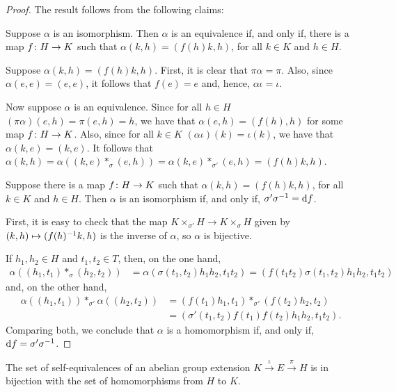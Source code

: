 \begin{proof}
	The result follows from the following claims:
	\newclaims
	\begin{claim}
		Suppose $\alpha$ is an isomorphism.
		Then $\alpha$ is an equivalence if, and only if, there is a map $f\colon H \to K$ such that $\alpha(k,h) = (f(h)k, h)$, for all $k\in K$ and $h\in H$.
	\end{claim}

	Suppose $\alpha(k,h) = (f(h)k, h)$.
	First, it is clear that $\pi \alpha = \pi$.
	Also, since $\alpha(e,e) = (e,e)$, it follows that $f(e) = e$ and, hence, $\alpha \iota = \iota$.

	Now suppose $\alpha$ is an equivalence.
	Since for all $h\in H$ $(\pi \alpha) (e, h) = \pi (e, h) = h$, we have that $\alpha (e, h) = (f(h), h)$ for some map $f\colon H\to K$.
	Also, since for all $k\in K$ $(\alpha \iota) (k) = \iota(k)$, we have that $\alpha(k, e) = (k,e)$.
	It follows that $\alpha (k,h) = \alpha((k,e) *_\sigma (e, h)) = \alpha(k, e) *_{\sigma'} (e, h) = (f(h)k, h)$.

	\begin{claim}
		Suppose there is a map $f\colon H \to K$ such that $\alpha(k,h) = (f(h)k, h)$, for all $k\in K$ and $h\in H$.
		Then $\alpha$ is an isomorphism if, and only if, $\sigma'\sigma^{-1} = \mathrm{d}f$.
	\end{claim}

	First, it is easy to check that the map $K \times_{\sigma'} H \to K \times_{\sigma} H$ given by $(k,h)\mapsto (f(h)^{-1} k, h)$ is the inverse of $\alpha$, so $\alpha$ is bijective.

	If $h_1, h_2 \in H$ and $t_1, t_2 \in T$, then, on the one hand,
	\begin{align*}
		\alpha ((h_1, t_1)*_{\sigma}(h_2, t_2) ) & = \alpha (\sigma(t_1, t_2) h_1 h_2, t_1 t_2) =
		( f(t_1 t_2)\sigma(t_1, t_2) h_1 h_2, t_1 t_2)
	\end{align*}
	and, on the other hand,
	\begin{align*}
		\alpha ((h_1, t_1)) *_{\sigma'} \alpha ((h_2, t_2) ) & = ( f(t_1) h_1, t_1) *_{\sigma'} ( f(t_2) h_2, t_2) \\&=
		(\sigma'(t_1, t_2) f(t_1) f(t_2) h_1 h_2, t_1 t_2).
	\end{align*}
	Comparing both, we conclude that $\alpha$ is a homomorphism if, and only if, $\mathrm{d}f = \sigma' \sigma^{-1}$.
\end{proof}

\begin{cor}\label{cor:self-equivalences-are-homomorphisms}
	The set of self-equivalences of an abelian group extension $K \xrightarrow{\iota} E \xrightarrow{\pi} H$ is in bijection with the set of homomorphisms from $H$ to $K$.
\end{cor}

